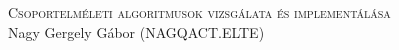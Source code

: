 \begin{center}

\textsc{Csoportelméleti algoritmusok vizsgálata és implementálása}\\[1.5cm]
Nagy Gergely Gábor (NAGQACT.ELTE)\\[10cm]


\end{center}

\thispagestyle{empty}
\clearpage

